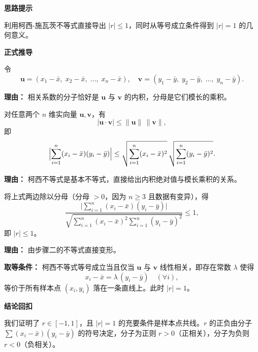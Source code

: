 \begin{proofbox}
	\textbf{\textcolor{CProof}{思路提示}}

	利用柯西-施瓦茨不等式直接导出 $|r|\le 1$，同时从等号成立条件得到 $|r|=1$ 的几何意义。

	\medskip
	\textbf{\textcolor{CProof}{正式推导}}
	\begin{description}[style=nextline, leftmargin=2.8em, labelsep=0.5em, itemsep=0.55em]
		\item[\textbf{步骤一（构造两个向量）：}] 令
			\[
				\mathbf{u} = (x_1-\bar{x},\;x_2-\bar{x},\;\dots,\;x_n-\bar{x}),\quad
				\mathbf{v} = (y_1-\bar{y},\;y_2-\bar{y},\;\dots,\;y_n-\bar{y}).
			\]
			\par\textbf{理由：} 相关系数的分子恰好是 $\mathbf{u}$ 与 $\mathbf{v}$ 的内积，分母是它们模长的乘积。

		\item[\textbf{步骤二（应用柯西-施瓦茨不等式）：}] 对任意两个 $n$ 维实向量 $\mathbf{u},\mathbf{v}$，有
			\[
				|\mathbf{u}\cdot\mathbf{v}| \le \|\mathbf{u}\|\,\|\mathbf{v}\|,
			\]
			即
			\[
				\Bigl|\sum_{i=1}^{n}(x_i-\bar{x})(y_i-\bar{y})\Bigr|
				\le \sqrt{\sum_{i=1}^{n}(x_i-\bar{x})^2}\,\sqrt{\sum_{i=1}^{n}(y_i-\bar{y})^2}.
			\]
			\par\textbf{理由：} 柯西不等式是基本不等式，直接给出内积绝对值与模长乘积的关系。

		\item[\textbf{步骤三（除以分母得 $|r|\le 1$ 并讨论等号）：}] 将上式两边除以分母（分母 $>0$，因为 $n\ge3$ 且数据有变异），得
			\[
				\frac{\bigl|\sum_{i=1}^{n} (x_i-\bar{x})(y_i-\bar{y})\bigr|}
				{\sqrt{\sum_{i=1}^{n} (x_i-\bar{x})^2\sum_{i=1}^{n} (y_i-\bar{y})^2}} \le 1,
			\]
			即 $|r|\le 1$。
			\par\textbf{理由：} 由步骤二的不等式直接变形。
			\par\textbf{取等条件：} 柯西不等式等号成立当且仅当 $\mathbf{u}$ 与 $\mathbf{v}$ 线性相关，即存在常数 $\lambda$ 使得
			\[
				x_i-\bar{x} = \lambda\,(y_i-\bar{y})\quad (\forall i),
			\]
			等价于所有样本点 $(x_i,y_i)$ 落在一条直线上。此时 $|r|=1$。
	\end{description}

	\medskip
	\textbf{\textcolor{CProof}{结论回扣}}

	我们证明了 $r\in[-1,1]$，且 $|r|=1$ 的充要条件是样本点共线。$r$ 的正负由分子 $\sum (x_i-\bar{x})(y_i-\bar{y})$ 的符号决定，分子为正则 $r>0$（正相关），分子为负则 $r<0$（负相关）。
\end{proofbox}
